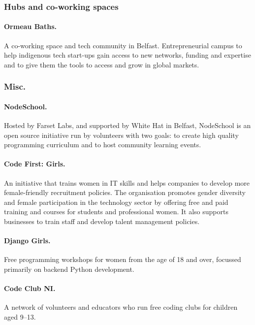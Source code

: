 \subsubsection{Hubs and co-working spaces}

\paragraph{Ormeau Baths.} A co-working space and tech community in Belfast. Entrepreneurial campus to help indigenous tech start-ups gain access to new networks, funding and expertise and to give them the tools to access and grow in global markets.

\subsubsection{Misc.}

\paragraph{NodeSchool.} Hosted by Farset Labs, and supported by White Hat in Belfast, NodeSchool is an open source initiative run by volunteers with two goals: to create high quality programming curriculum and to host community learning events.

\paragraph{Code First: Girls.} An initiative that trains women in IT skills and helps companies to develop more female-friendly recruitment policies. The organisation promotes gender diversity and female participation in the technology sector by offering free and paid training and courses for students and professional women. It also supports businesses to train staff and develop talent management policies.

\paragraph{Django Girls.} Free programming workshops for women from the age of 18 and over, focussed primarily on backend Python development.

\paragraph{Code Club NI.} A network of volunteers and educators who run free coding clubs for children aged 9--13.

